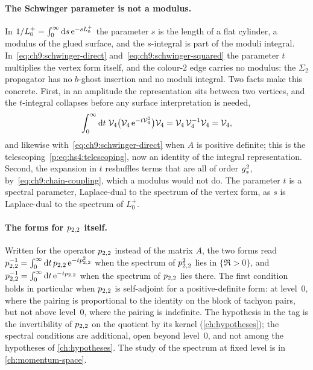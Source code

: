 \paragraph{The Schwinger parameter is not a modulus.}
In $1 / L_0^+ = \int_0^\infty \mathrm{d} s \, \mathrm{e}^{- s L_0^+}$ the parameter $s$ is the length of a flat cylinder, a modulus of the glued surface, and the $s$-integral is part of the moduli integral.
In~\eqref{eq:ch9:schwinger-direct} and~\eqref{eq:ch9:schwinger-squared} the parameter $t$ multiplies the vertex form itself, and the colour-$2$ edge carries no modulus: the $\Sigma_2$ propagator has no $b$-ghost insertion and no moduli integral.
Two facts make this concrete.
First, in an amplitude the representation sits between two vertices, and the $t$-integral collapses before any surface interpretation is needed,
\begin{equation}
  \label{eq:ch9:sandwich}
  \int_0^\infty \mathrm{d} t \; \mathcal{V}_{4} \big( \mathcal{V}_{4} \, \mathrm{e}^{- t \mathcal{V}_{4}^2} \big) \mathcal{V}_{4}
    = \mathcal{V}_{4} \, \mathcal{V}_{4}^{-1} \mathcal{V}_{4}
    = \mathcal{V}_{4},
\end{equation}
and likewise with~\eqref{eq:ch9:schwinger-direct} when $A$ is positive definite; this is the telescoping~\eqref{p:eq:hs4:telescoping}, now an identity of the integral representation.
Second, the expansion in $t$ reshuffles terms that are all of order $g_s^2$, by~\eqref{eq:ch9:chain-coupling}, which a modulus would not do.
The parameter $t$ is a spectral parameter, Laplace-dual to the spectrum of the vertex form, as $s$ is Laplace-dual to the spectrum of $L_0^+$.

\paragraph{The forms for $p_{2,2}$ itself.}
Written for the operator $p_{2,2}$ instead of the matrix $A$, the two forms read $p_{2,2}^{-1} = \int_0^\infty \mathrm{d} t \, p_{2,2} \, \mathrm{e}^{- t p_{2,2}^2}$ when the spectrum of $p_{2,2}^2$ lies in $\{\Re > 0\}$, and $p_{2,2}^{-1} = \int_0^\infty \mathrm{d} t \, \mathrm{e}^{- t p_{2,2}}$ when the spectrum of $p_{2,2}$ lies there.
The first condition holds in particular when $p_{2,2}$ is self-adjoint for a positive-definite form: at level~$0$, where the pairing is proportional to the identity on the block of tachyon pairs, but not above level~$0$, where the pairing is indefinite.
The hypothesis in the tag is the invertibility of $p_{2,2}$ on the quotient by its kernel (\cref{ch:hypotheses}); the spectral conditions are additional, open beyond level~$0$, and not among the hypotheses of \cref{ch:hypotheses}.
The study of the spectrum at fixed level is in \cref{ch:momentum-space}.

